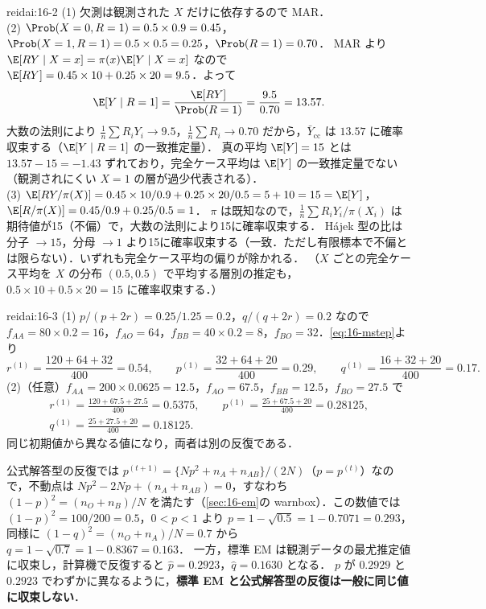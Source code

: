 \begin{kaitou}{reidai:16-2}
(1) 欠測は観測された $X$ だけに依存するので MAR．\\
(2) $\Prob(X=0,R=1)=0.5\times0.9=0.45$，$\Prob(X=1,R=1)=0.5\times0.5=0.25$，$\Prob(R=1)=0.70$．
MAR より $\E[RY\mid X=x]=\pi(x)\E[Y\mid X=x]$ なので $\E[RY]=0.45\times10+0.25\times20=9.5$．よって
\[
\E[Y\mid R=1]=\frac{\E[RY]}{\Prob(R=1)}=\frac{9.5}{0.70}=13.57 .
\]
大数の法則により $\frac1n\sum R_iY_i\to9.5$，$\frac1n\sum R_i\to0.70$ だから，$\bar Y_{\mathrm{cc}}$ は $13.57$ に確率収束する（$\E[Y\mid R=1]$ の一致推定量）．
真の平均 $\E[Y]=15$ とは $13.57-15=-1.43$ ずれており，完全ケース平均は $\E[Y]$ の一致推定量でない（観測されにくい $X=1$ の層が過少代表される）．\\
(3) $\E[RY/\pi(X)]=0.45\times10/0.9+0.25\times20/0.5=5+10=15=\E[Y]$，$\E[R/\pi(X)]=0.45/0.9+0.25/0.5=1$．
$\pi$ は既知なので，$\frac1n\sum R_iY_i/\pi(X_i)$ は期待値が15（不偏）で，大数の法則により15に確率収束する．
Hájek 型の比は分子 $\to15$，分母 $\to1$ より15に確率収束する（一致．ただし有限標本で不偏とは限らない）．いずれも完全ケース平均の偏りが除かれる．
（$X$ ごとの完全ケース平均を $X$ の分布 $(0.5,0.5)$ で平均する層別の推定も，$0.5\times10+0.5\times20=15$ に確率収束する．）
\end{kaitou}

\begin{kaitou}{reidai:16-3}
(1) $p/(p+2r)=0.25/1.25=0.2$，$q/(q+2r)=0.2$ なので
$f_{AA}=80\times0.2=16$，$f_{AO}=64$，$f_{BB}=40\times0.2=8$，$f_{BO}=32$．\cref{eq:16-mstep}より
\[
r^{(1)}=\frac{120+64+32}{400}=0.54,\qquad p^{(1)}=\frac{32+64+20}{400}=0.29,\qquad q^{(1)}=\frac{16+32+20}{400}=0.17 .
\]
(2)（任意）$f_{AA}=200\times0.0625=12.5$，$f_{AO}=67.5$，$f_{BB}=12.5$，$f_{BO}=27.5$ で
\begin{gather*}
r^{(1)}=\frac{120+67.5+27.5}{400}=0.5375,\qquad p^{(1)}=\frac{25+67.5+20}{400}=0.28125,\\
q^{(1)}=\frac{25+27.5+20}{400}=0.18125 .
\end{gather*}
同じ初期値から異なる値になり，両者は別の反復である．
\end{kaitou}
\begin{supbox}[補足：公式解答型の反復の極限]
公式解答型の反復では $p^{(t+1)}=\{Np^2+n_A+n_{AB}\}/(2N)$（$p=p^{(t)}$）なので，不動点は $Np^2-2Np+(n_A+n_{AB})=0$，すなわち
$(1-p)^2=(n_O+n_B)/N$ を満たす（\cref{sec:16-em}の warnbox）．この数値では $(1-p)^2=100/200=0.5$，$0<p<1$ より $p=1-\sqrt{0.5}=1-0.7071=0.293$，
同様に $(1-q)^2=(n_O+n_A)/N=0.7$ から $q=1-\sqrt{0.7}=1-0.8367=0.163$．
一方，標準 EM は観測データの最尤推定値に収束し，計算機で反復すると $\hat p=0.2923$，$\hat q=0.1630$ となる．
$p$ が $0.2929$ と $0.2923$ でわずかに異なるように，\textbf{標準 EM と公式解答型の反復は一般に同じ値に収束しない}．
\end{supbox}

